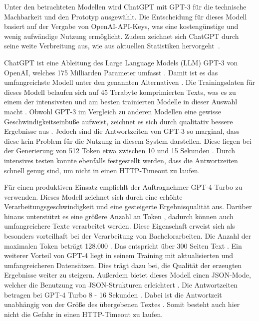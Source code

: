 Unter den betrachteten Modellen wird ChatGPT mit GPT-3 für die technische Machbarkeit und den Prototyp ausgewählt.
Die Entscheidung für dieses Modell basiert auf der Vergabe von OpenAI-API-Keys, was eine kostengünstige und wenig aufwändige Nutzung ermöglicht.
Zudem zeichnet sich ChatGPT durch seine weite Verbreitung aus, wie aus aktuellen Statistiken hervorgeht~\autocite{statista.gpt}.

ChatGPT ist eine Ableitung des Large Language Models (LLM) GPT-3 von OpenAI, welches 175 Milliarden Parameter umfasst \autocite[][S. 5]{openai.gpt}.
Damit ist es das umfangreichste Modell unter den genannten Alternativen \autocite{statista.gpt}.
Die Trainingsdaten für dieses Modell belaufen sich auf 45 Terabyte komprimierten Texts, was es zu einem der intensivsten und am besten trainierten Modelle in dieser Auswahl macht \autocite[][S. 8]{openai.gpt}.
Obwohl GPT-3 im Vergleich zu anderen Modellen eine gewisse Geschwindigkeitseinbuße aufweist, zeichnet es sich durch qualitativ bessere Ergebnisse aus \autocite{mindsdb.llm}.
Jedoch sind die Antwortzeiten von GPT-3 so marginal, dass diese kein Problem für die Nutzung in diesem System darstellen.
Diese liegen bei der Generierung von 512 Token etwa zwischen 10 und 15 Sekunden \autocite{gptforwork.gpt3}.
Durch intensives testen konnte ebenfalls festgestellt werden, dass die Antwortzeiten schnell genug sind, um nicht in einen HTTP-Timeout zu laufen.

Für einen produktiven Einsatz empfiehlt der Auftragnehmer GPT-4 Turbo zu verwenden.
Dieses Modell zeichnet sich durch eine erhöhte Verarbeitungsgeschwindigkeit und eine gesteigerte Ergebnisqualität aus.
Darüber hinaus unterstützt es eine größere Anzahl an Token \autocite{openai.gpt4}, dadurch können auch umfangreichere Texte verarbeitet werden.
Diese Eigenschaft erweist sich als besonders vorteilhaft bei der Verarbeitung von Bachelorarbeiten.
Die Anzahl der maximalen Token beträgt 128.000 \autocite{openai.gpt4}.
Das entspricht über 300 Seiten Text \autocite{openai.blog.gpt4}.
Ein weiterer Vorteil von GPT-4 liegt in seinem Training mit aktualisierten und umfangreicheren Datensätzen.
Dies trägt dazu bei, die Qualität der erzeugten Ergebnisse weiter zu steigern.
Außerdem bietet dieses Modell einen \ac{JSON}-Mode, welcher die Benutzung von \ac{JSON}-Strukturen erleichtert \autocite{openai.gpt4}.
Die Antwortzeiten betragen bei GPT-4 Turbo 8 - 16 Sekunden \autocite{nuvalence.gpt4}.
Dabei ist die Antwortzeit unabhängig von der Größe des übergebenen Textes \autocite{nuvalence.gpt4}.
Somit besteht auch hier nicht die Gefahr in einen HTTP-Timeout zu laufen.


